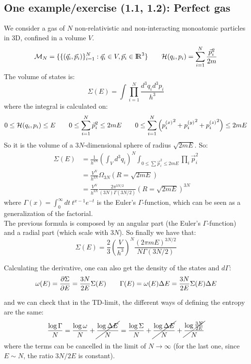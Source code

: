 \subsection{One example/exercise (1.1, 1.2): Perfect gas}
We consider a gas of $N$ non-relativistic and non-interacting monoatomic particles in 3D, confined in a volume $V$.
$$
 \mathcal{M}_N = \{\{(\vec q_i, \vec p_i)\}_{i=1}^N : \vec q_i \in V, \vec p_i \in {\rm I\!R}^3 \} \qquad 
 \mathcal{H}(q_i,p_i) = \sum_{i=1}^N \frac{\vec p^2_i}{2m}
$$
The volume of states is:
$$ \Sigma(E) = \int \prod_{i=1}^N \frac{d^3q_i d^3p_i}{h^3}$$
where the integral is calculated on:
$$ 0 \le \mathcal{H}(q_i, p_i)\le E \qquad 0 \le \sum_{i=1}^N {\vec p_i}^2 \le 2mE \qquad 0 \le \sum_{i=1}^N\left({p_i^{(x)}}^2+ {p_i^{(y)}}^2 + {p_i^{(z)}}^2\right) \le 2mE$$
So it is the volume of a $3N$-dimensional sphere of radius $\sqrt{2mE}$. So:
\begin{align*}
\Sigma(E) &= \frac 1{h^{3N}}\left(\int_V d^3 q_i\right)^N \int_{0 \le \sum \vec p_i^2 \le 2mE} \prod_i \vec p_i^2 \\
&= \frac{V^N}{h^{3N}}\Omega_{3N}(R= \sqrt{2mE}) \\
&= \frac{V^N}{h^{3N}} \frac{2\pi^{3N/2}}{(3N)\Gamma(3N/2)}(R=\sqrt{2mE})^{3N}
\end{align*} 
where $\Gamma(x) = \int_0^\infty dt\ t^{x-1}e^{-t}$ is the Euler's $\Gamma$-function, which can be seen as a generalization of the factorial. \\

The previous formula is composed by an angular part (the Euler's $\Gamma$-function) and a radial part (which scale with $3N$). So finally we have that:
$$ \Sigma(E) = \frac 23 \left(\frac{V}{h^3}\right)^N \frac {(2\pi mE)^{3N/2}}{N\Gamma (3N/2)} $$

Calculating the derivative, one can also get the density of the states and $d\Gamma$:
$$ \omega(E) = \frac{\partial\Sigma}{\partial E} = \frac {3N}{2E} \Sigma(E) \qquad \Gamma(E) = \omega(E)\Delta E = \frac{3N}{2E} \Sigma(E) \Delta E$$

and we can check that in the TD-limit, the different ways of defining the entropy are the same:
$$\frac{\log \Gamma}N = \frac{\log \omega}N + \cancel{\frac{\log \Delta E}N} = \frac{\log \Sigma}N + \cancel{\frac{\log \Delta E}N} + \cancel{\frac{\log \frac{3N}{2E}}N}$$
where the terms can be cancelled in the limit of $N\to \infty$ (for the last one, since $E \sim N$, the ratio $3N/2E$ is constant).\\

